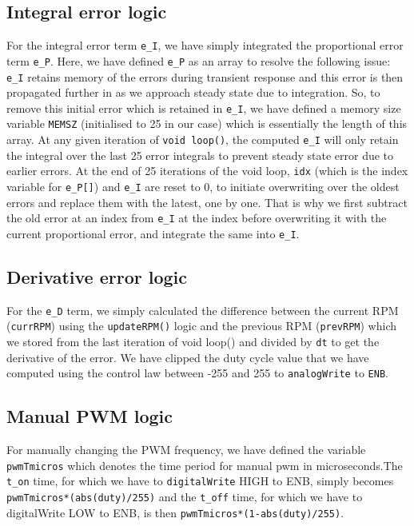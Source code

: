 \documentclass[12pt]{article}
\begin{document}
\subsection{Integral error logic}
For the integral error term \texttt{e\_I}, we have simply integrated the proportional error term \texttt{e\_P}. Here, we have defined \texttt{e\_P} as an array to resolve the following issue: \texttt{e\_I} retains memory of the errors during transient response and this error is then propagated further in as we approach steady state due to integration. So, to remove this initial error which is retained in \texttt{e\_I}, we have defined a memory size variable \texttt{MEMSZ} (initialised to 25 in our case) which is essentially the length of this array. At any given iteration of \texttt{void loop()}, the computed \texttt{e\_I} will only retain the integral over the last 25 error integrals to prevent steady state error due to earlier errors. At the end of 25 iterations of the void loop, \texttt{idx} (which is the index variable for \texttt{e\_P[]}) and \texttt{e\_I} are reset to 0, to initiate overwriting over the oldest errors and replace them with the latest, one by one. That is why we first subtract the old error at an index from \texttt{e\_I} at the index before overwriting it with the current proportional error, and integrate the same into \texttt{e\_I}. 

\subsection*{Derivative error logic}
For the \texttt{e\_D} term, we simply calculated the difference between the current RPM (\texttt{currRPM}) using the \texttt{updateRPM()} logic and the previous RPM (\texttt{prevRPM}) which we stored from the last iteration of void loop() and divided by \texttt{dt} to get the derivative of the error. We have clipped the duty cycle value that we have computed using the control law between -255 and 255 to \texttt{analogWrite} to \texttt{ENB}.

\subsection{Manual PWM logic}
For manually changing the PWM frequency, we have defined the variable \texttt{pwmTmicros} which denotes the time period for manual pwm in microseconds.The \texttt{t\_on} time, for which we have to \texttt{digitalWrite} HIGH to ENB, simply becomes \texttt{pwmTmicros*(abs(duty)/255)} and the \texttt{t\_off} time, for which we have to digitalWrite LOW to ENB, is then \texttt{pwmTmicros*(1-abs(duty)/255)}.
\end{document}
